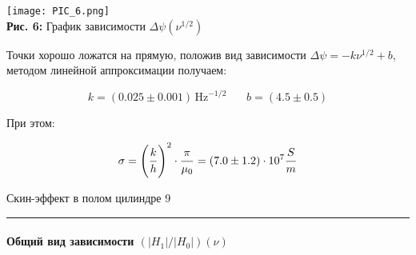 \documentclass[12pt,a4paper]{scrartcl}
\begin{document}
	\begin{center}
		\texttt{[image: PIC\_6.png]}
		\\\textbf{Рис. 6:} График зависимости $\Delta \psi(\nu^{1/2})$
	\end{center}
	
	Точки хорошо ложатся на прямую, положив вид зависимости $\Delta \psi = -k\nu^{1/2} + b$, методом линейной аппроксимации получаем:
	
	$$k = (0.025 \pm 0.001)\,\text{Hz}^{-1/2} \ \ \ \ \ \ \ \ b = (4.5 \pm 0.5)$$
	
	При этом:
	
	$$\sigma = \left(\dfrac{\strut k}{\strut h}\right)^2 \cdot \dfrac{\strut \pi}{\strut \mu_0} = (7.0 \pm 1.2) \cdot 10^7 \dfrac{\strut S}{\strut m}$$
	
	\newpage
	
	\begin{flushleft}
		\footnotesize{Скин-эффект в полом цилиндре} \hspace{\fill} \footnotesize{9}
		\\[-0.3cm]\noindent\rule{\textwidth}{0.3pt}
	\end{flushleft}
	
	\paragraph{Общий вид зависимости $(|H_1|/|H_0|)(\nu)$} \hfill
	
\end{document}
